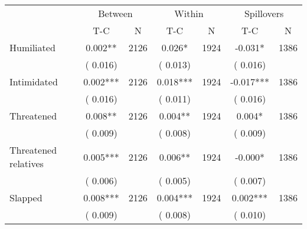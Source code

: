 
\begin{tabular}{l*{6}{c}}\hline&\multicolumn{2}{c}{Between}&\multicolumn{2}{c}{Within}&\multicolumn{2}{c}{Spillovers} \\ \cmidrule(r){2-3}\cmidrule(l){4-5}\cmidrule(l){6-7} & {T-C} & {N} & {T-C} & {N}  & {T-C}  & {N}  \\ \midrule
Humiliated        &              0.002**      &       2126       &              0.026*      &       1924       &             -0.031*      &       1386       \\
                       &       (       0.016)            &                               &       (       0.013)            &                               &       (       0.016)            &                               \\
Intimidated        &              0.002***      &       2126       &              0.018***      &       1924       &             -0.017***      &       1386       \\
                       &       (       0.016)            &                               &       (       0.011)            &                               &       (       0.016)            &                               \\
Threatened        &              0.008**      &       2126       &              0.004**      &       1924       &              0.004*      &       1386       \\
                       &       (       0.009)            &                               &       (       0.008)            &                               &       (       0.009)            &                               \\
Threatened relatives        &              0.005***      &       2126       &              0.006**      &       1924       &             -0.000*      &       1386       \\
                       &       (       0.006)            &                               &       (       0.005)            &                               &       (       0.007)            &                               \\
Slapped        &              0.008***      &       2126       &              0.004***      &       1924       &              0.002***      &       1386       \\
                       &       (       0.009)            &                               &       (       0.008)            &                               &       (       0.010)            &                               \\

\end{tabular}
